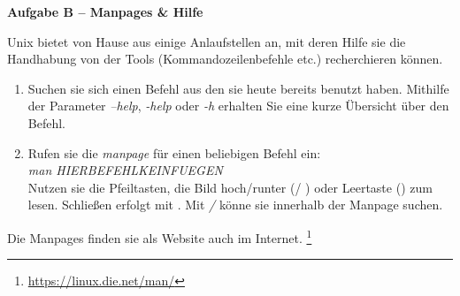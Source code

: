 \documentclass[paper=a4,fontsize=11pt]{scrartcl}%
\numberwithin{equation}{section}
\begin{document}
\begin{center}\Large{\textbf{Aufgabe B -- Manpages \& Hilfe}}\end{center}\vskip0.25in
Unix bietet von Hause aus einige Anlaufstellen an, mit deren Hilfe sie die Handhabung von der Tools (Kommandozeilenbefehle etc.) recherchieren können.
\begin{enumerate}
	\item Suchen sie sich einen Befehl aus den sie heute bereits benutzt haben. Mithilfe der Parameter \emph{--help}, \emph{-help} oder \emph{-h} erhalten Sie eine kurze Übersicht über den Befehl.
    \item Rufen sie die \emph{manpage} für einen beliebigen Befehl ein: \\
    		\emph{man HIERBEFEHLKEINFUEGEN}\\
		 Nutzen sie die Pfeiltasten, die Bild hoch/runter (/ ) oder Leertaste (\keys{\Space}) zum lesen. Schließen erfolgt mit . Mit \emph{/} könne sie innerhalb der Manpage suchen.
\end{enumerate}
Die Manpages finden sie als Website auch im Internet. \footnote{\url{https://linux.die.net/man/}}
\end{document}

